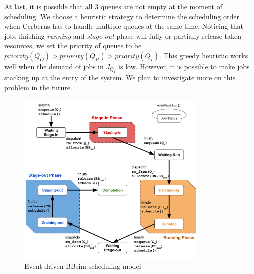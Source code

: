 At last, it is possible that all 3 queues are not empty at the moment of scheduling.
We choose a heuristic strategy to determine the scheduling order when
Cerberus has to handle multiple queues at the same time.
Noticing that jobs finishing \textit{running} and \textit{stage-out} phase
will fully or partially release taken resources,
we set the priority of queues to be $priority(Q_O) > priority(Q_R) > priority(Q_I)$.
This greedy heuristic works well when the demand of jobs in $J_{Q_I}$ is low.
However, it is possible to make jobs stacking up at the entry of the system.
We plan to investigate more on this problem in the future.

\begin{figure}[!htbp]
\centering
        \includegraphics[width=3.6in]{3PhaseJobFSM}
        \caption{Event-driven BBsim scheduling model}
\label{Fig:JobFSM}
\end{figure}

